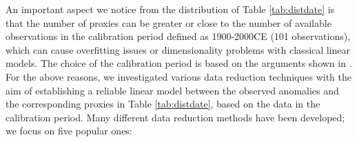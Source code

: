 \documentclass[12pt]{amsart}
\theoremstyle{plain}
\theoremstyle{definition}
\theoremstyle{remark}
\begin{document}
An important aspect we notice from the distribution of Table
\ref{tab:distdate} is that the number of proxies can be greater or 
close to the number of available observations in the calibration period defined as
1900-2000CE (101 observations), which can cause overfitting issues or
dimensionality problems with classical linear models. The choice of the calibration period is based on the
  arguments shown in \cite{Barboza2014}. For the above
reasons, we investigated various data reduction techniques with the aim of establishing 
a reliable linear model between the observed anomalies and the corresponding proxies in
Table \ref{tab:distdate}, based on the data in the calibration
period. Many different data reduction methods have been developed; we focus on five popular ones:  
\end{document}
